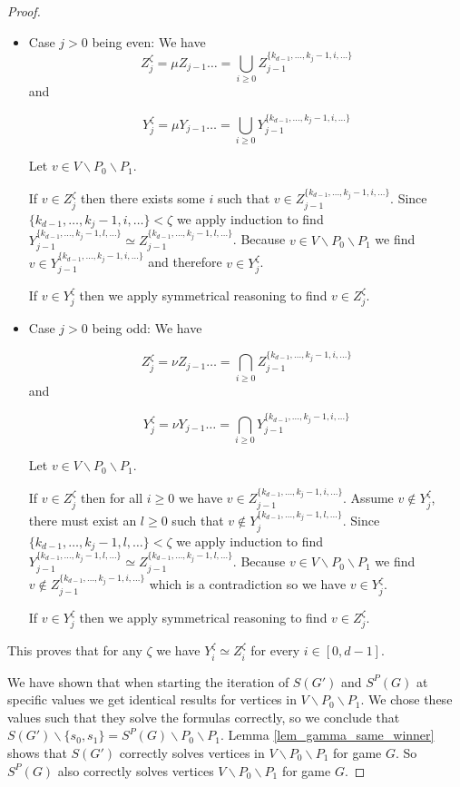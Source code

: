 \begin{theorem}
\begin{proof}
\begin{itemize}
			\item Case $j > 0$ being even: We have 
			\[ Z_j^{\zeta} = \mu Z_{j-1}\dots = \bigcup_{i\geq 0} Z_{j-1}^{\{k_{d-1},\dots,k_j-1,i,\dots\}}\]
			and 
			
			\[ Y_j^{\zeta} = \mu Y_{j-1}\dots = \bigcup_{i\geq 0} Y_{j-1}^{\{k_{d-1},\dots,k_j-1,i,\dots\}}\]
			
			Let $v \in V \backslash P_0 \backslash P_1$.
			
			If $v \in Z_j^{\zeta}$ then there exists some $i$ such that $v \in Z_{j-1}^{\{k_{d-1},\dots,k_j-1,i,\dots\}}$. Since $\{k_{d-1},\dots,k_j-1,i,\dots\} < \zeta$ we apply induction to find $Y_{j-1}^{\{k_{d-1},\dots,k_j-1,l,\dots\}} \simeq Z_{j-1}^{\{k_{d-1},\dots,k_j-1,l,\dots\}}$. Because $v \in V \backslash P_0 \backslash P_1$ we find $v \in Y_{j-1}^{\{k_{d-1},\dots,k_j-1,i,\dots\}}$ and therefore $v \in Y_j^{\zeta}$.
			
			If $v \in Y_j^{\zeta}$ then we apply symmetrical reasoning to find $v \in Z_j^{\zeta}$.
			\item Case $j > 0$ being odd: We have 
			
			\[ Z_j^{\zeta} = \nu Z_{j-1}\dots = \bigcap_{i\geq 0} Z_{j-1}^{\{k_{d-1},\dots,k_j-1,i,\dots\}}\]
			and 
			
			\[ Y_j^{\zeta} = \nu Y_{j-1}\dots = \bigcap_{i\geq 0} Y_{j-1}^{\{k_{d-1},\dots,k_j-1,i,\dots\}}\]
			
			Let $v \in V \backslash P_0 \backslash P_1$.
			
			If $v \in Z_j^{\zeta}$ then for all $i \geq 0$ we have $v \in Z_{j-1}^{\{k_{d-1},\dots,k_j-1,i,\dots\}}$. Assume $v \notin Y_j^{\zeta}$, there must exist an $l \geq 0$ such that $v \notin Y_j^{\{k_{d-1},\dots,k_j-1,l,\dots\}}$. Since $\{k_{d-1},\dots,k_j-1,l,\dots\} < \zeta$ we apply induction to find $Y_{j-1}^{\{k_{d-1},\dots,k_j-1,l,\dots\}} \simeq Z_{j-1}^{\{k_{d-1},\dots,k_j-1,l,\dots\}}$. Because $v \in V \backslash P_0 \backslash P_1$ we find $v \notin Z_{j-1}^{\{k_{d-1},\dots,k_j-1,i,\dots\}}$ which is a contradiction so we have $v \in Y_j^{\zeta}$.
			
			If $v \in Y_j^{\zeta}$ then we apply symmetrical reasoning to find $v \in Z_j^{\zeta}$.
		\end{itemize}
		
		This proves that for any $\zeta$ we have $Y_i^{\zeta} \simeq Z_i^{\zeta}$ for every $i \in [0,d-1]$.
		
		We have shown that when starting the iteration of $S(G')$ and $S^P(G)$ at specific values we get identical results for vertices in $V \backslash P_0 \backslash P_1$. We chose these values such that they solve the formulas correctly, so we conclude that $S(G') \backslash \{s_0,s_1\} = S^P(G) \backslash P_0 \backslash P_1$. Lemma \ref{lem_gamma_same_winner} shows that $S(G')$ correctly solves vertices in $V \backslash P_0 \backslash P_1$ for game $G$. So $S^P(G)$ also correctly solves vertices $V \backslash P_0 \backslash P_1$ for game $G$. 
		

\end{proof}
\end{theorem}
